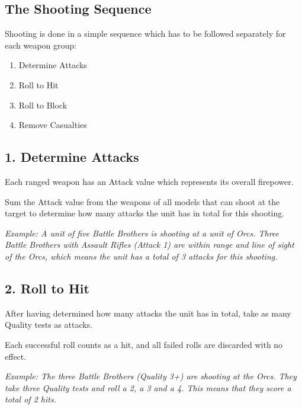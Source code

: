 \documentclass[9pt, a4paper]{extarticle}            %
\begin{document}
\begin{multicols}{2}
\subsection{The Shooting Sequence}

Shooting is done in a simple sequence which has to be followed separately for each weapon group:

\begin{enumerate}
  \item Determine Attacks
  \item Roll to Hit
  \item Roll to Block
  \item Remove Casualties
\end{enumerate}

\columnbreak

\subsection{1. Determine Attacks}

Each ranged weapon has an Attack value which represents its overall firepower.

Sum the Attack value from the weapons of all models that can shoot at the target to determine how many attacks the unit has in total for this shooting.

\textit{Example: A unit of five Battle Brothers is shooting at a unit of Orcs. Three Battle Brothers with Assault Rifles (Attack 1) are within range and line of sight of the Orcs, which means the unit has a total of 3 attacks for this shooting.}

\subsection{2. Roll to Hit}

After having determined how many attacks the unit has in total, take as many Quality tests as attacks.

Each successful roll counts as a hit, and all failed rolls are discarded with no effect.

\textit{Example: The three Battle Brothers (Quality 3+) are shooting at the Orcs. They take three Quality tests and roll a 2, a 3 and a 4. This means that they score a total of 2 hits.}


\end{multicols}
\end{document}
